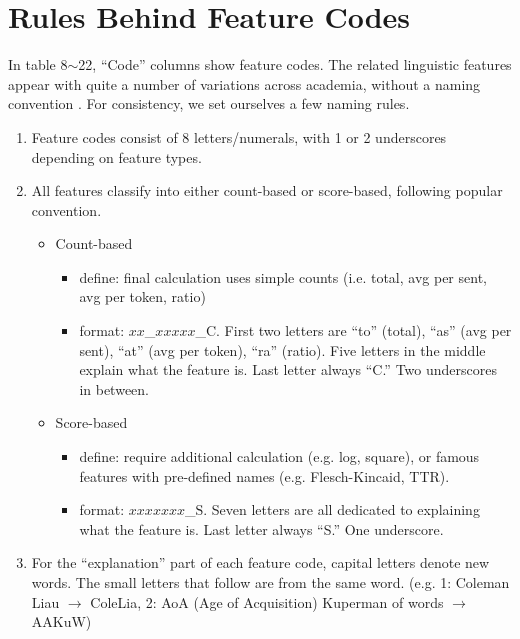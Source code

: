 \documentclass[11pt]{article}
\begin{document}
\section{Rules Behind Feature Codes}
In table 8$\sim$22, ``Code'' columns show feature codes. The related linguistic features appear with quite a number of variations across academia, without a naming convention \citep{A09, 11, A10, A11, A13, A15, A19, A20, lee2020lxper}. For consistency, we set ourselves a few naming rules.
\begin{enumerate}[leftmargin=*]
  \setlength\itemsep{0.1ex}
  \item Feature codes consist of 8 letters/numerals, with 1 or 2 underscores depending on feature types.
  \item All features classify into either count-based or score-based, following popular convention.
  \begin{itemize}[leftmargin=*]
      \item Count-based
      \begin{itemize}[leftmargin=*]
      \item define: final calculation uses simple counts (i.e. total, avg per sent, avg per token, ratio)
      \item format: $xx$\_$xxxxx$\_$\text{C}$. First two letters are ``to'' (total), ``as'' (avg per sent), ``at'' (avg per token), ``ra'' (ratio). Five letters in the middle explain what the feature is. Last letter always ``C.'' Two underscores in between.
      \end{itemize}
      \item Score-based
      \begin{itemize}[leftmargin=*]
      \item define: require additional calculation (e.g. log, square), or famous features with pre-defined names (e.g. Flesch-Kincaid, TTR).
      \item format: $xxxxxxx$\_$\text{S}$. Seven letters are all dedicated to explaining what the feature is. Last letter always ``S.'' One underscore.
      \end{itemize}
  \end{itemize}
  \item For the ``explanation'' part of each feature code, capital letters denote new words. The small letters that follow are from the same word. (e.g. 1: Coleman Liau $\rightarrow$ ColeLia, 2: AoA (Age of Acquisition) Kuperman of words $\rightarrow$ AAKuW)
\end{enumerate}
\end{document}
